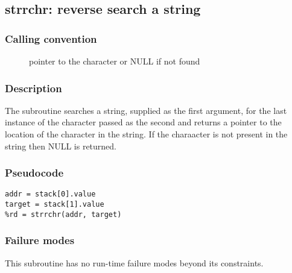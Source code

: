 \clearpage
{}
{}
\label{subr:strrchr}
\subsection*{strrchr: reverse search a string}

\subsubsection*{Calling convention}

\begin{description}
\item[] pointer to the character or NULL if not found
\end{description}

\subsubsection*{Description}

The  subroutine searches a string, supplied as the
first argument, for the last instance of the character passed as the
second and returns a pointer to the location of the character in the
string.  If the charaacter is not present in the string then NULL is
returned.

\subsubsection*{Pseudocode}

\begin{verbatim}
addr = stack[0].value
target = stack[1].value
%rd = strrchr(addr, target)
\end{verbatim}

\subsubsection*{Failure modes}

This subroutine has no run-time failure modes beyond its constraints.
